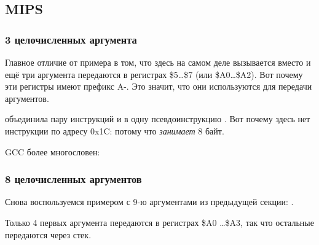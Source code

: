 \subsection{MIPS}

\subsubsection{3 целочисленных аргумента}


Главное отличие от примера \q{\HelloWorldSectionName} в том, что здесь на самом деле
вызывается \printf вместо \puts и ещё три аргумента передаются в регистрах  \$5\dots \$7 (или \$A0\dots \$A2).
Вот почему эти регистры имеют префикс A-. Это значит, что они используются для передачи аргументов.





\IDA объединила пару инструкций  и  в одну псевдоинструкцию .
Вот почему здесь нет инструкции по адресу 0x1C: потому что  \emph{занимает} 8 байт.


\NonOptimizing GCC более многословен:





\subsubsection{8 целочисленных аргументов}

Снова воспользуемся примером с 9-ю аргументами из предыдущей секции: .




Только 4 первых аргумента передаются в регистрах \$A0 \dots \$A3, так что остальные передаются через стек.

